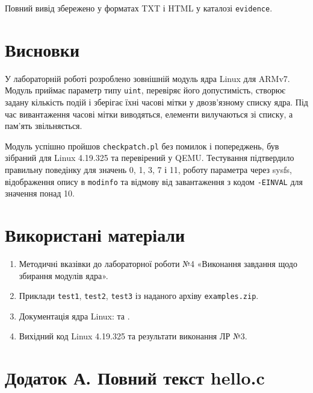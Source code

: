 \documentclass[12pt,a4paper]{article}
\begin{document}
Повний вивід збережено у форматах TXT і HTML у каталозі
\texttt{evidence}.

\section{Висновки}

У лабораторній роботі розроблено зовнішній модуль ядра Linux для ARMv7.
Модуль приймає параметр типу \texttt{uint}, перевіряє його допустимість,
створює задану кількість подій і зберігає їхні часові мітки у двозв'язному
списку ядра. Під час вивантаження часові мітки виводяться, елементи
вилучаються зі списку, а пам'ять звільняється.

Модуль успішно пройшов \texttt{checkpatch.pl} без помилок і попереджень,
був зібраний для Linux 4.19.325 та перевірений у QEMU. Тестування підтвердило
правильну поведінку для значень 0, 1, 3, 7 і 11, роботу параметра через
sysfs, відображення опису в \texttt{modinfo} та відмову від завантаження з
кодом \texttt{-EINVAL} для значення понад 10.

\section*{Використані матеріали}

\begin{enumerate}[leftmargin=*]
  \item Методичні вказівки до лабораторної роботи №4 «Виконання завдання щодо збирання модулів ядра».
  \item Приклади \texttt{test1}, \texttt{test2}, \texttt{test3} із наданого архіву \texttt{examples.zip}.
  \item Документація ядра Linux: 
    та .
  \item Вихідний код Linux 4.19.325 та результати виконання ЛР №3.
\end{enumerate}

\newpage
\section*{Додаток А. Повний текст hello.c}

\end{document}
